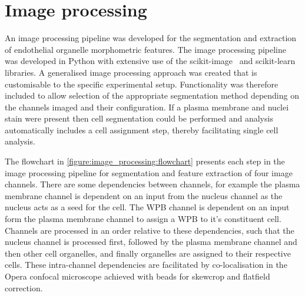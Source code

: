 \section{Image processing}
\label{endothelial_morphometry:image_processing}
An image processing pipeline was developed for the segmentation and extraction of endothelial organelle morphometric features. The image processing pipeline was developed in Python with extensive use of the scikit-image~\cite{VanderWalt2014} and scikit-learn~\cite{Pedregosa2011} libraries. A generalised image processing approach was created that is customisable to the specific experimental setup. Functionality was therefore included to allow selection of the appropriate segmentation method depending on the channels imaged and their configuration. If a plasma membrane and nuclei stain were present then cell segmentation could be performed and analysis automatically includes a cell assignment step, thereby facilitating single cell analysis.

The flowchart in \autoref{figure:image_processing:flowchart} presents each step in the image processing pipeline for segmentation and feature extraction of four image channels. There are some dependencies between channels, for example the plasma membrane channel is dependent on an input from the nucleus channel as the nucleus acts as a seed for the cell. The WPB channel is dependent on an input form the plasma membrane channel to assign a WPB to it's constituent cell. Channels are processed in an order relative to these dependencies, such that the nucleus channel is processed first, followed by the plasma membrane channel and then other cell organelles, and finally organelles are assigned to their respective cells. These intra-channel dependencies are facilitated by co-localisation in the Opera confocal microscope achieved with beads for skewcrop and flatfield correction.


